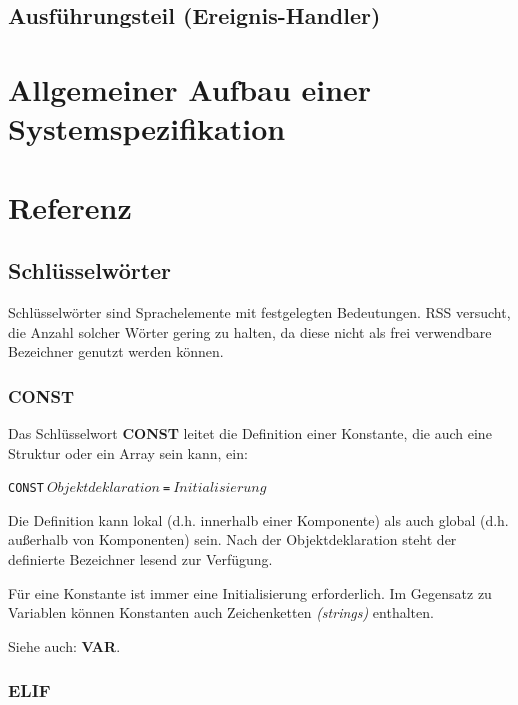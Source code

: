 \documentclass{scrartcl}
\begin{document}
\subsection{Ausführungsteil (Ereignis-Handler)}

\section{Allgemeiner Aufbau einer Systemspezifikation}

\section{Referenz}

\subsection{Schlüsselwörter}

\noindent Schlüsselwörter sind Sprachelemente mit festgelegten Bedeutungen. RSS versucht, die Anzahl solcher Wörter gering zu halten, da diese nicht als frei verwendbare Bezeichner genutzt werden können.

\subsubsection{CONST}

\noindent Das Schlüsselwort \textbf{CONST} leitet die Definition einer Konstante, die auch eine Struktur oder ein Array sein kann, ein:

\vspace{10pt}
\texttt{CONST$~Objektdeklaration~$=$~Initialisierung~$}

\vspace{10pt}
\noindent Die Definition kann lokal (d.h. innerhalb einer Komponente) als auch global (d.h. außerhalb von Komponenten) sein. Nach der Objektdeklaration steht der definierte Bezeichner lesend zur Verfügung.

\vspace{10pt}
\noindent Für eine Konstante ist immer eine Initialisierung erforderlich. Im Gegensatz zu Variablen können Konstanten auch Zeichenketten \textit{(strings)} enthalten.

\vspace{10pt}
\noindent Siehe auch: \textbf{VAR}.

\subsubsection{ELIF}
\end{document}
